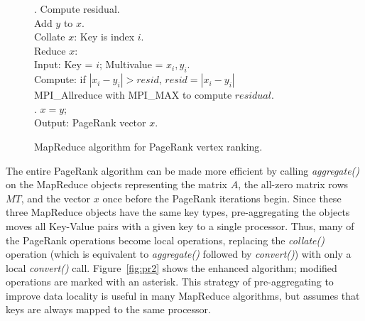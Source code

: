 \begin{figure}[htb]
\begin{center}
{\begin{minipage}{\textwidth}
\begin{tabbing}
. Compute residual. \\
\> \> Add $y$ to $x$. \\
\> \> Collate $x$:  Key is index $i$. \\
\> \> Reduce $x$:   \\
\> \> \> Input:  Key = $i$; Multivalue = $x_i, y_i$. \\
\> \> \> Compute:  if $|x_i - y_i| > {resid}$, ${resid} = |x_i - y_i|$ \\
\> \> MPI\_Allreduce with MPI\_MAX to compute $residual$. \\
. $x = y$; \\
Output:  PageRank vector $x$.
  \end{tabbing}
 \end{minipage}}\end{center}

 \caption{MapReduce algorithm for PageRank vertex ranking.}

 \label{fig:pr}
\end{figure}

The entire PageRank algorithm can be made more efficient by calling
{\it aggregate()} on the MapReduce objects representing the matrix $A$, 
the all-zero matrix rows $MT$, and the vector $x$ once before the PageRank 
iterations begin.  Since these three MapReduce
objects have the same key types, pre-aggregating the objects moves all
Key-Value pairs with a given key to a single processor.  Thus, many of
the PageRank operations become local operations, replacing 
the {\it collate()} operation (which is equivalent to {\it aggregate()} 
followed by {\it convert()}) with only a local {\it convert()} call. 
Figure~\ref{fig:pr2} shows the
enhanced algorithm; modified operations are marked with an asterisk.
This strategy of pre-aggregating to improve data locality is useful in
many MapReduce algorithms, but assumes that keys are always mapped to
the same processor.

